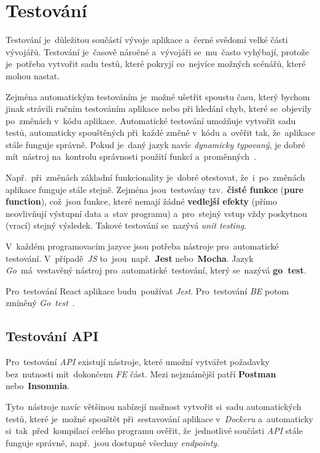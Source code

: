 \documentclass[11pt,a4paper]{report}
\let\oldacrshort\acrshort
\renewcommand{\acrshort}[1]{\emph{\normalsize\color[rgb]{0,0,0}\noindent\oldacrshort{#1}}}
\begin{document}
        \section{Testování}
            Testování je~důležitou součástí vývoje aplikace a~černé svědomí velké části vývojářů. Testování je~časově náročné a~vývojáři se~mu~často vyhýbají, protože je~potřeba vytvořit sadu testů, které pokryjí co~nejvíce možných scénářů, které mohou nastat.
            
            Zejména automatickým testováním je~možné ušetřit spoustu času, který bychom jinak strávili ručním testováním aplikace nebo při hledání chyb, které se~objevily po~změnách v~kódu aplikace. Automatické testování umožňuje vytvořit sadu testů, automaticky spouštěných při~každé změně v~kódu a~ověřit tak, že~aplikace stále funguje správně. Pokud je~daný jazyk navíc \emph{dynamicky typovaný}, je dobré mít~nástroj na~kontrolu správnosti použití funkcí a~proměnných~\cite{compilers, itnetworkBestPractices}.
            
            Např.~při~změnách základní funkcionality je~dobré otestovat, že~i~po~změnách aplikace funguje stále stejně. Zejména jsou~testovány tzv.~\textbf{čisté funkce} (\textbf{pure function}), což~jsou funkce, které nemají žádné \textbf{vedlejší efekty} (přímo neovlivňují výstupní data a~stav programu) a~pro~stejný vstup vždy poskytnou (vrací) stejný výsledek. Takové testování se~nazývá \emph{unit testing}.
            
            V~každém programovacím jazyce jsou potřeba nástroje pro~automatické testování. V~případě~\acrshort{JS} to~jsou~např.~\textbf{Jest} nebo~\textbf{Mocha}. Jazyk \emph{Go}~má~vestavěný nástroj pro~automatické~testování, který se~nazývá \textbf{go~test}.
            
            Pro~testování React aplikace budu~používat \emph{Jest}. Pro~testování \acrshort{BE} potom zmíněný \emph{Go~test}~\cite{jestjsTestingReact}.
            
            \subsection{Testování API}
                Pro~testování \acrshort{API} existují nástroje, které umožní vytvářet požadavky bez~nutnosti mít~dokončenu \acrshort{FE} část. Mezi nejznámější patří \textbf{Postman} nebo~\textbf{Insomnia}.
                
                Tyto~nástroje navíc většinou nabízejí možnost vytvořit si~sadu automatických testů, které je~možné spouštět při~sestavování aplikace v~\emph{Dockeru} a~automaticky si~tak~před~kompilací celého programu ověřit, že~jednotlivé součásti \acrshort{API} stále funguje správně, např.~jsou dostupné všechny \emph{endpointy}.
\end{document}
